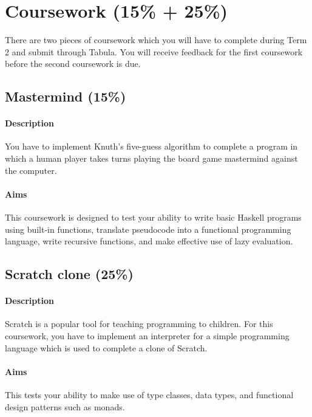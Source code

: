 \pagebreak
\section{Coursework (15\% + 25\%)}

There are two pieces of coursework which you will have to complete during Term 2 and submit through Tabula. You will receive feedback for the first coursework before the second coursework is due.

\subsection{Mastermind (15\%)}

\paragraph{Description} You have to implement Knuth's five-guess algorithm to complete a program in which a human player takes turns playing the board game mastermind against the computer. 

\paragraph{Aims} This coursework is designed to test your ability to write basic Haskell programs using built-in functions, translate pseudocode into a functional programming language, write recursive functions, and make effective use of lazy evaluation. 

\subsection{Scratch clone (25\%)}

\paragraph{Description} Scratch is a popular tool for teaching programming to children. For this coursework, you have to implement an interpreter for a simple programming language which is used to complete a clone of Scratch. 

\paragraph{Aims} This tests your ability to make use of type classes, data types, and functional design patterns such as monads.